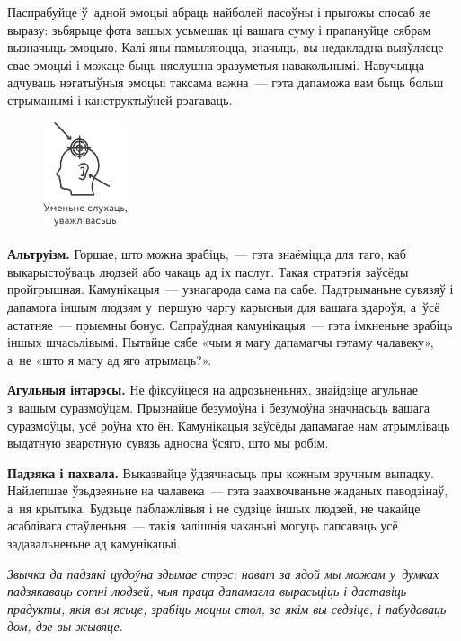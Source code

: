 
Паспрабуйце ў~адной эмоцыі абраць найболей пасоўны і прыгожы спосаб яе выразу: зьбярыце фота вашых усьмешак ці вашага суму і прапануйце сябрам вызначыць эмоцыю. Калі яны памыляюцца, значыць, вы недакладна выяўляеце свае эмоцыі і можаце быць няслушна зразуметыя навакольнымі. Навучыцца адчуваць нэгатыўныя эмоцыі таксама важна~--- гэта дапаможа вам быць больш стрыманымі і канструктыўней рэагаваць.

\begin{figure}[htb!]
  \centering
  \includegraphics[scale=1.5]{willpower/ch10/8.pdf}
\end{figure}

\textbf{Альтруізм.} Горшае, што можна зрабіць,~--- гэта знаёміцца для таго, каб выкарыстоўваць людзей або чакаць ад іх паслуг. Такая стратэгія заўсёды пройгрышная. Камунікацыя~--- узнагарода сама па сабе. Падтрыманьне сувязяў і дапамога іншым людзям у~першую чаргу карысныя для вашага здароўя, а~ўсё астатняе~--- прыемны бонус. Сапраўдная камунікацыя~--- гэта імкненьне зрабіць іншых шчасьлівымі. Пытайце сябе «чым я магу дапамагчы гэтаму чалавеку», а~не «што я магу ад яго атрымаць?».

\textbf{Агульныя інтарэсы.} Не фіксуйцеся на адрозьненьнях, знайдзіце агульнае з~вашым суразмоўцам. Прызнайце безумоўна і безумоўна значнасьць вашага суразмоўцы, усё роўна хто ён. Камунікацыя заўсёды дапамагае нам атрымліваць выдатную зваротную сувязь адносна ўсяго, што мы робім.

\textbf{Падзяка і пахвала.} Выказвайце ўдзячнасьць пры кожным зручным выпадку. Найлепшае ўзьдзеяньне на чалавека~--- гэта заахвочваньне жаданых паводзінаў, а~ня крытыка. Будзьце паблажлівыя і не судзіце іншых людзей, не чакайце асаблівага стаўленьня~--- такія залішнія чаканьні могуць сапсаваць усё задавальненьне ад камунікацыі.

\emph{Звычка да падзякі цудоўна здымае стрэс: нават за ядой мы можам у~думках падзякаваць сотні людзей, чыя праца дапамагла вырасьціць і даставіць прадукты, якія вы ясьце, зрабіць моцны стол, за якім вы седзіце, і пабудаваць дом, дзе вы жывяце.}

